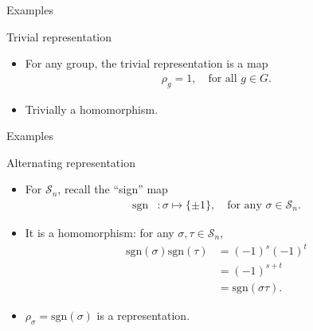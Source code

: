 \documentclass[10pt]{beamer}
\newcommand{\Sym}{\mathcal{S}}
\newcommand{\sgn}{\text{sgn}}
\begin{document}
	\begin{frame}{Examples}
		\begin{block}{Trivial representation}
			\begin{itemize}
				\item For any group, the trivial representation is a map
				\begin{align*}
					\rho_g = 1, \quad \text{for all $g \in G$.}
				\end{align*}
				
				\item Trivially a homomorphism.
			\end{itemize}
			
		\end{block}
	\end{frame}
	\begin{frame}{Examples}
%				
%				

		\begin{block}{Alternating representation}
			\begin{itemize}
				\item For $\Sym_n$, recall the ``sign'' map
				\begin{align*}
					\sgn &: \sigma \mapsto \{\pm 1\}, \quad \text{for any } \sigma \in \Sym_n.
				\end{align*}\pause
				
				\item It is a homomorphism: for any $\sigma, \tau \in \Sym_n$,
				\begin{align*}
					\sgn(\sigma)\sgn(\tau) &= (-1)^s(-1)^t \\
					&= (-1)^{s+t} \\
					&= \sgn(\sigma\tau).
				\end{align*}\pause
				
				\item $\rho_\sigma = \sgn(\sigma)$ is a representation.
			\end{itemize}
		\end{block}
	\end{frame}
\end{document}
